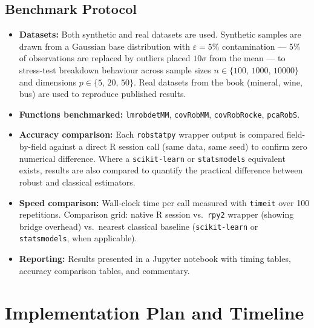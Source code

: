 \documentclass[11pt, a4paper]{article}
\begin{document}
\subsection{Benchmark Protocol}

\begin{itemize}[leftmargin=1.5em, itemsep=3pt]
  \item \textbf{Datasets:}
    Both synthetic and real datasets are used. Synthetic samples are
    drawn from a Gaussian base distribution with $\varepsilon = 5\%$
    contamination --- 5\% of observations are replaced by outliers
    placed $10\sigma$ from the mean --- to stress-test breakdown
    behaviour across sample sizes $n \in \{100,\,1000,\,10000\}$ and
    dimensions $p \in \{5,\,20,\,50\}$.
    Real datasets from the book (mineral, wine, bus) are used to
    reproduce published results.

  \item \textbf{Functions benchmarked:}
    \texttt{lmrobdetMM}, \texttt{covRobMM}, \texttt{covRobRocke},
    \texttt{pcaRobS}.

  \item \textbf{Accuracy comparison:}
    Each \texttt{robstatpy} wrapper output is compared field-by-field
    against a direct R session call (same data, same seed) to confirm
    zero numerical difference. Where a \texttt{scikit-learn} or
    \texttt{statsmodels} equivalent exists, results are also compared
    to quantify the practical difference between robust and
    classical estimators.

  \item \textbf{Speed comparison:}
    Wall-clock time per call measured with \texttt{timeit} over 100
    repetitions. Comparison grid: native R session
    vs.\ \texttt{rpy2} wrapper (showing bridge overhead)
    vs.\ nearest classical baseline (\texttt{scikit-learn} or
    \texttt{statsmodels}, when applicable).

  \item \textbf{Reporting:}
    Results presented in a Jupyter notebook with timing tables,
    accuracy comparison tables, and commentary.
\end{itemize}

\section{Implementation Plan and Timeline}
\end{document}
